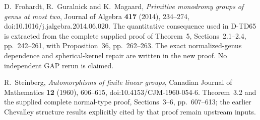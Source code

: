 D.~Frohardt, R.~Guralnick and K.~Magaard,
\emph{Primitive monodromy groups of genus at most two},
Journal of Algebra \textbf{417} (2014), 234--274,
doi:10.1016/j.jalgebra.2014.06.020.
The quantitative consequence used in D-TD65 is extracted from the
complete supplied proof of Theorem~5, Sections~2.1--2.4,
pp.~242--261, with Proposition~36, pp.~262--263.
The exact normalized-genus dependence and spherical-kernel repair
are written in the new proof. No independent GAP rerun is claimed.

R.~Steinberg, \emph{Automorphisms of finite linear groups},
Canadian Journal of Mathematics \textbf{12} (1960), 606--615,
doi:10.4153/CJM-1960-054-6.
Theorem~3.2 and the supplied complete normal-type proof,
Sections~3--6, pp.~607--613; the earlier Chevalley structure
results explicitly cited by that proof remain upstream inputs.
